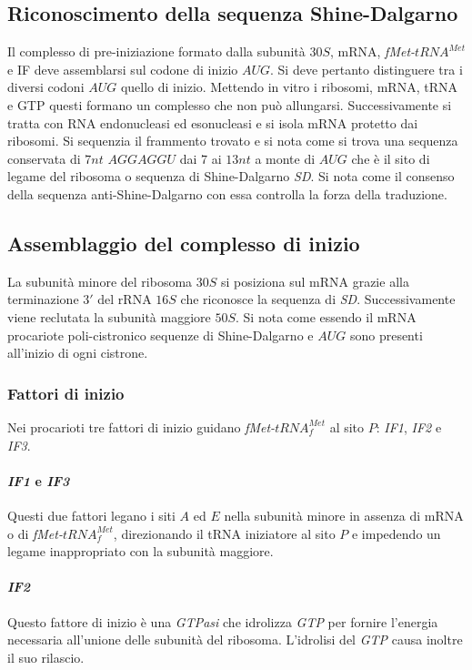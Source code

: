 \subsection{Riconoscimento della sequenza Shine-Dalgarno}
Il complesso di pre-iniziazione formato dalla subunit\`a $30S$, mRNA, \emph{fMet-$tRNA^{Met}$} e IF deve assemblarsi sul codone di inizio $AUG$. Si deve pertanto distinguere tra i diversi codoni $AUG$
quello di inizio. Mettendo in vitro i ribosomi, mRNA, tRNA e GTP questi formano un complesso che non pu\`o allungarsi. Successivamente si tratta con RNA endonucleasi ed esonucleasi e si isola mRNA 
protetto dai ribosomi. Si sequenzia il frammento trovato e si nota come si trova una sequenza conservata di $7nt$ $AGGAGGU$ dai $7$ ai $13nt$ a monte di $AUG$ che \`e il sito di legame del ribosoma
o sequenza di Shine-Dalgarno \emph{SD}. Si nota come il consenso della sequenza anti-Shine-Dalgarno con essa controlla la forza della traduzione. 
\subsection{Assemblaggio del complesso di inizio}
La subunit\`a minore del ribosoma $30S$ si posiziona sul mRNA grazie alla terminazione $3'$ del rRNA $16S$ che riconosce la sequenza di \emph{SD}. Successivamente viene reclutata la subunit\`a maggiore
$50S$. Si nota come essendo il mRNA procariote poli-cistronico sequenze di Shine-Dalgarno e $AUG$ sono presenti all'inizio di ogni cistrone. 
\subsubsection{Fattori di inizio}
Nei procarioti tre fattori di inizio guidano \emph{fMet-$tRNA_f^{Met}$} al sito $P$: \emph{IF1}, \emph{IF2} e \emph{IF3}.
\paragraph{\emph{IF1} e \emph{IF3}} Questi due fattori legano i siti $A$ ed $E$ nella subunit\`a minore in assenza di mRNA o di \emph{fMet-$tRNA_f^{Met}$}, direzionando il tRNA iniziatore al sito $P$ e 
impedendo un legame inappropriato con la subunit\`a maggiore. 
\paragraph{\emph{IF2}} Questo fattore di inizio \`e una \emph{GTPasi} che idrolizza \emph{GTP} per fornire l'energia necessaria all'unione delle subunit\`a del ribosoma. L'idrolisi del \emph{GTP} causa
inoltre il suo rilascio.

